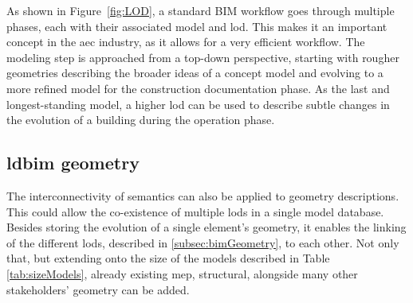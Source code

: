 As shown in Figure~\ref{fig:LOD}, a standard BIM workflow goes through multiple phases, each with their associated model and \ac{lod}. This makes it an important concept in the \ac{aec} industry, as it allows for a very efficient workflow. The modeling step is approached from a top-down perspective, starting with rougher geometries describing the broader ideas of a concept model and evolving to a more refined model for the construction documentation phase. As the last and longest-standing model, a higher \ac{lod} can be used to describe subtle changes in the evolution of a building during the operation phase.

\subsection{\acs{ldbim} geometry}
The interconnectivity of semantics can also be applied to geometry descriptions. This could allow the co-existence of multiple \ac{lod}s in a single model database. Besides storing the evolution of a single element's geometry, it enables the linking of the different \ac{lod}s, described in \ref{subsec:bimGeometry}, to each other. Not only that, but extending onto the size of the models described in Table \ref{tab:sizeModels}, already existing \ac{mep}, structural, alongside many other stakeholders' geometry can be added.